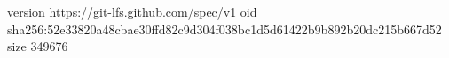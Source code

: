 version https://git-lfs.github.com/spec/v1
oid sha256:52e33820a48cbae30ffd82c9d304f038bc1d5d61422b9b892b20dc215b667d52
size 349676
